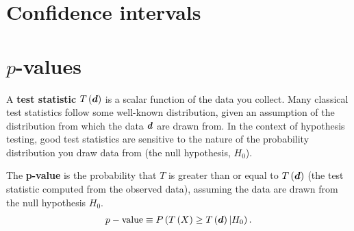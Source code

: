 \section{Confidence intervals}

\section{$p$-values}
A \textbf{test statistic} $T\left({\bm d}\right)$ is a scalar function of the data you collect.
Many classical test statistics follow some well-known distribution, given an assumption of the distribution from which the data ${\bm d}$ are drawn from.
In the context of hypothesis testing, good test statistics are sensitive to the nature of the probability distribution you draw data from (the null hypothesis, $H_0$). 

The \textbf{p-value} is the probability that $T$ is greater than or equal to $T\left({\bm d}\right)$ (the test statistic computed from the observed data), assuming the data are drawn from the null hypothesis $H_0$.
\begin{align}
    \label{eq:p-value-definition}
    p-\mathrm{value}
    \equiv
    P\left(T\left(X\right)\geq T\left({\bm d}\right)|H_0\right)
    .
\end{align}

